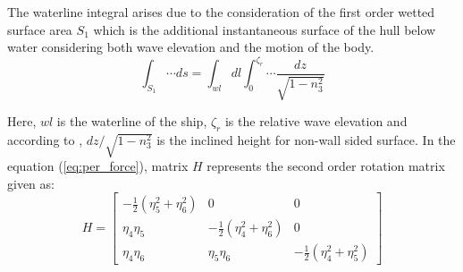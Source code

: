 The waterline integral arises due to the consideration of the first order wetted surface 
area $S_1$ which is the additional instantaneous surface of the hull below water considering 
both wave elevation and the motion of the body.
\begin{equation}
    \int_{S_1}\cdots ds = \int_{wl} dl \int_{0}^{\zeta_r}\cdots \frac{dz}{\sqrt{1-n^2_3}}
\end{equation}

Here, $wl$ is the waterline of the ship, $\zeta_r$ is the relative wave elevation and
according to \cite{guha2015effect}, $dz/\sqrt{1-n^2_3}$ is the inclined height for 
non-wall sided surface. In the equation (\ref{eq:per_force}), matrix $H$ represents 
the second order rotation matrix given as:
\begin{equation}
    H = \begin{bmatrix}
        -\frac{1}{2}(\eta_5^2+\eta_6^2) & 0 & 0\\
        \eta_4\eta_5 & -\frac{1}{2}(\eta_4^2+\eta_6^2) & 0\\
        \eta_4\eta_6 & \eta_5\eta_6 & -\frac{1}{2}(\eta_4^2+\eta_5^2)
        \end{bmatrix}
\end{equation} 


